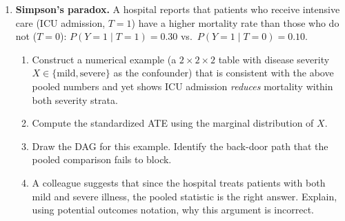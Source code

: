 \documentclass[master.tex]{subfiles}
\begin{document}
\begin{enumerate}
\item \textbf{Simpson's paradox.}
  A hospital reports that patients who receive intensive care (ICU
  admission, $T{=}1$) have a higher mortality rate than those who do
  not ($T{=}0$): $P(Y{=}1 \mid T{=}1) = 0.30$ vs.\
  $P(Y{=}1 \mid T{=}0) = 0.10$.
  \begin{enumerate}
    \item Construct a numerical example (a $2 \times 2 \times 2$
      table with disease severity $X \in \{\text{mild}, \text{severe}\}$
      as the confounder) that is consistent with the above pooled
      numbers and yet shows ICU admission \emph{reduces} mortality
      within both severity strata.
    \item Compute the standardized ATE using the marginal distribution
      of $X$.
    \item Draw the DAG for this example.  Identify the back-door path
      that the pooled comparison fails to block.
    \item A colleague suggests that since the hospital treats patients
      with both mild and severe illness, the pooled statistic is the
      right answer.  Explain, using potential outcomes notation, why
      this argument is incorrect.
  \end{enumerate}

\end{enumerate}

\ifSubfilesClassLoaded{%
  
  
}{}
\end{document}
